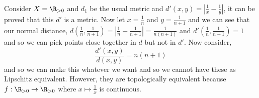 Consider $X = \R_{>0}$ and $d_1$ be the usual metric and $d'(x, y) = \left| \frac{1}{x} - \frac{1}{y} \right|$, it can be proved that this $d'$ is a metric. Now let $x = \frac{1}{n}$ and $y = \frac{1}{n+1}$ and we can see that our normal distance, $d\left(\frac{1}{n}, \frac{1}{n+1}\right) = \left| \frac{1}{n} - \frac{1}{n+1}\right| = \frac{1}{n(n+1)}$ and $d'\left(\frac{1}{n}, \frac{1}{n+1}\right) = 1$ and so we can pick points close together in $d$ but not in $d'$. Now consider,
$$ \frac{d'(x, y)}{d(x, y)} = n(n+1) $$
and so we can make this whatever we want and so we cannot have these as Lipschitz equivalent. However, they are topologically equivalent because $f : \R_{>0} \to \R_{>0}$ where $x \mapsto \frac{1}{x}$ is continuous.